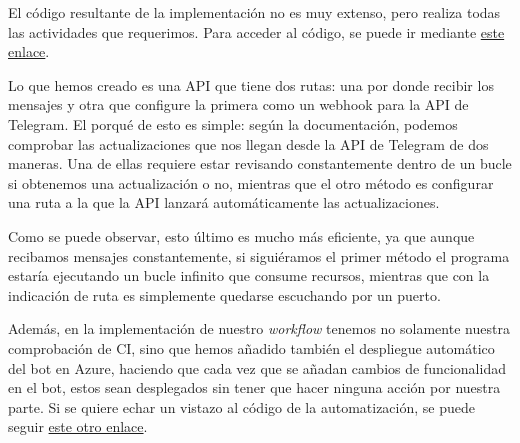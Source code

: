 El código resultante de la implementación no es muy extenso, pero realiza todas las 
actividades que requerimos. Para acceder al código, se puede ir mediante 
\href{https://github.com/jero-dev/proyecto-tfg/blob/main/src/bot/telegram/main.go}{este enlace}.

Lo que hemos creado es una API que tiene dos rutas: una por donde recibir los 
mensajes y otra que configure la primera como un webhook para la API de Telegram. 
El porqué de esto es simple: según la documentación, podemos comprobar las 
actualizaciones que nos llegan desde la API de Telegram de dos maneras. Una de 
ellas requiere estar revisando constantemente dentro de un bucle si obtenemos 
una actualización o no, mientras que el otro método es configurar una ruta a la que 
la API lanzará automáticamente las actualizaciones.

Como se puede observar, esto último es mucho más eficiente, ya que aunque recibamos 
mensajes constantemente,  si siguiéramos el primer método el programa estaría 
ejecutando un bucle infinito que consume recursos, mientras que con la indicación 
de ruta es simplemente quedarse escuchando por un puerto.

Además, en la implementación de nuestro \textit{workflow} 
tenemos no solamente nuestra comprobación de CI, sino que hemos añadido también el 
despliegue automático del bot en Azure, haciendo que cada vez que se añadan cambios 
de funcionalidad en el bot, estos sean desplegados sin tener que hacer ninguna 
acción por nuestra parte. Si se quiere echar un vistazo al código de la 
automatización, se puede seguir 
\href{https://github.com/jero-dev/proyecto-tfg/blob/main/.github/workflows/bot-telegram-ci.yml}{este otro enlace}.
